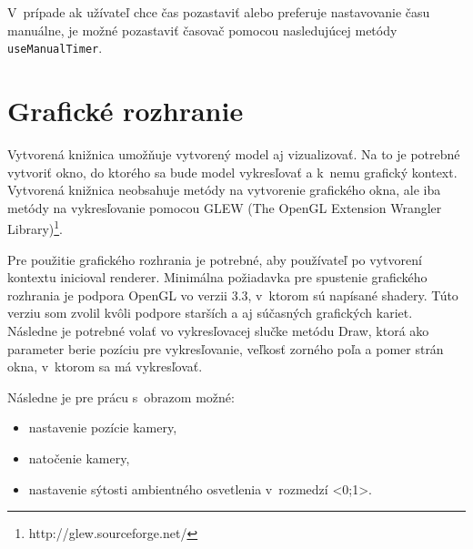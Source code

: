 V~prípade ak užívateľ chce čas pozastaviť alebo preferuje nastavovanie času manuálne, je možné pozastaviť časovač pomocou nasledujúcej metódy \texttt{useManualTimer}.

\section{Grafické rozhranie}
Vytvorená knižnica umožňuje vytvorený model aj vizualizovať. Na to je potrebné vytvoriť okno, do ktorého sa bude model vykresľovať a k~nemu grafický kontext. Vytvorená knižnica neobsahuje metódy na vytvorenie grafického okna, ale iba metódy na vykresľovanie  pomocou GLEW (The OpenGL Extension Wrangler Library)\footnote{http://glew.sourceforge.net/}.

Pre použitie grafického rozhrania je potrebné, aby používateľ po vytvorení kontextu inicioval renderer. Minimálna požiadavka pre spustenie grafického rozhrania je podpora OpenGL vo verzii 3.3, v~ktorom sú napísané shadery. Túto verziu som zvolil kvôli podpore starších a aj súčasných grafických kariet. 
Následne je potrebné volať vo vykresľovacej slučke metódu Draw, ktorá ako parameter berie pozíciu pre vykresľovanie, veľkosť zorného poľa a pomer strán okna, v~ktorom sa má vykresľovať.

Následne je pre prácu s~obrazom možné:
\begin{itemize}
\item nastavenie pozície kamery,
\item natočenie kamery,
\item nastavenie sýtosti ambientného osvetlenia v~rozmedzí <0;1>.
\end{itemize}





